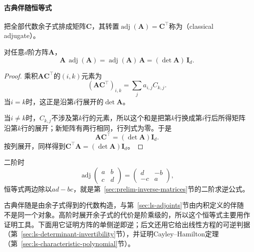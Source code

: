 \paragraph{古典伴随恒等式}
把全部代数余子式排成矩阵$\bm C$，其转置$\operatorname{adj}(\bm A)=\bm C^\top$称为（classical adjugate）。
\begin{theorem}[古典伴随恒等式]
\label{thm:ls-adjugate-identity}
对任意$d$阶方阵$\bm A$，
\begin{equation}
 \bm A\,\operatorname{adj}(\bm A)
 =\operatorname{adj}(\bm A)\,\bm A
 =(\det\bm A)\,\bm I_d.
 \label{eq:ls-adjugate-identity}
\end{equation}
\end{theorem}
\begin{proof}
乘积$\bm A\bm C^\top$的$(i,k)$元素为
\[
 (\bm A\bm C^\top)_{i,k}=\sum_j a_{i,j}C_{k,j}.
\]
当$i=k$时，这正是沿第$i$行展开的$\det\bm A$。

当$i\neq k$时，$C_{k,j}$不涉及第$k$行的元素，所以这个和是把第$k$行换成第$i$行后所得矩阵沿第$k$行的展开；新矩阵有两行相同，行列式为零。于是
\[
 \bm A\bm C^\top=(\det\bm A)\bm I_d.
\]
按列展开，同样得到$\bm C^\top\bm A=(\det\bm A)\bm I_d$。
\end{proof}
二阶时
\[
 \operatorname{adj}\begin{pmatrix}a&b\\c&d\end{pmatrix}=\begin{pmatrix}d&-b\\-c&a\end{pmatrix},
\]
恒等式两边除以$ad-bc$，就是第~\ref{sec:prelim-inverse-matrices}节的二阶求逆公式。

古典伴随是由余子式得到的代数构造，与第~\ref{sec:ls-adjoints}节由内积定义的伴随不是同一个对象。高阶时展开余子式的代价是阶乘级的，所以这个恒等式主要用作证明工具。下面用它证明方阵的单侧逆即逆；后文还用它给出线性方程的可逆判据（第~\ref{sec:ls-determinant-invertibility}节），并证明Cayley--Hamilton定理（第~\ref{sec:ls-characteristic-polynomial}节）。

